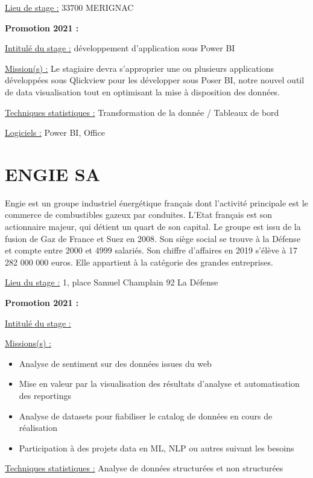 \documentclass[
  letterpaper,
  DIV=11,
  numbers=noendperiod]{scrreprt}
\begin{document}
\uline{Lieu de stage :} 33700 MERIGNAC

\textbf{Promotion 2021 :}

\uline{Intitulé du stage :} développement d'application sous Power BI

\uline{Mission(s) :} Le stagiaire devra s'approprier une ou plusieurs
applications développées sous Qlickview pour les développer sous Poser
BI, notre nouvel outil de data visualisation tout en optimisant la mise
à disposition des données.

\uline{Techniques statistiques :} Transformation de la donnée / Tableaux
de bord

\uline{Logiciels :} Power BI, Office

\hypertarget{engie-sa}{%
\section{\texorpdfstring{\textbf{ENGIE SA}}{ENGIE SA}}\label{engie-sa}}

Engie est un groupe industriel énergétique français dont l'activité
principale est le commerce de combustibles gazeux par conduites. L'Etat
français est son actionnaire majeur, qui détient un quart de son
capital. Le groupe est issu de la fusion de Gaz de France et Suez en
2008. Son siège social se trouve à la Défense et compte entre 2000 et
4999 salariés. Son chiffre d'affaires en 2019 s'élève à 17 282 000 000
euros. Elle appartient à la catégorie des grandes entreprises.

\uline{Lieu du stage :} 1, place Samuel Champlain 92 La Défense

\textbf{Promotion 2021 :}

\uline{Intitulé du stage :}

\uline{Missions(s) :}

\begin{itemize}
\item
  Analyse de sentiment sur des données issues du web
\item
  Mise en valeur par la visualisation des résultats d'analyse et
  automatisation des reportings
\item
  Analyse de datasets pour fiabiliser le catalog de données en cours de
  réalisation
\item
  Participation à des projets data en ML, NLP ou autres suivant les
  besoins
\end{itemize}

\uline{Techniques statistiques :} Analyse de données structurées et non
structurées
\end{document}
